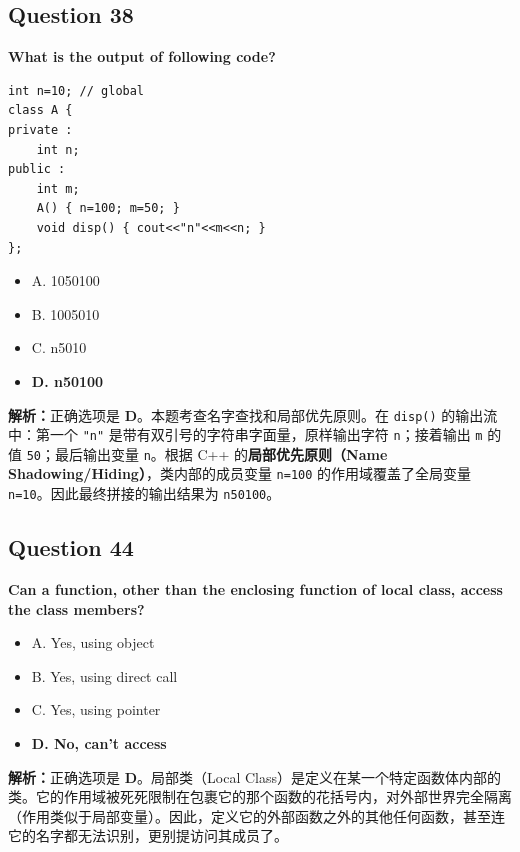 \documentclass[11pt, a4paper]{article}
\begin{document}

\subsection*{Question 38}
\textbf{What is the output of following code?}
\begin{lstlisting}
int n=10; // global
class A {
private :
    int n;
public :
    int m;
    A() { n=100; m=50; }
    void disp() { cout<<"n"<<m<<n; }
};
\end{lstlisting}
\begin{itemize}
    \item A. 1050100
    \item B. 1005010
    \item C. n5010
    \item \textbf{D. n50100}
\end{itemize}

\textbf{解析：}正确选项是 \textbf{D}。本题考查名字查找和局部优先原则。在 \texttt{disp()} 的输出流中：第一个 \texttt{"n"} 是带有双引号的字符串字面量，原样输出字符 \texttt{n}；接着输出 \texttt{m} 的值 \texttt{50}；最后输出变量 \texttt{n}。根据 C++ 的\textbf{局部优先原则（Name Shadowing/Hiding）}，类内部的成员变量 \texttt{n=100} 的作用域覆盖了全局变量 \texttt{n=10}。因此最终拼接的输出结果为 \texttt{n50100}。


\subsection*{Question 44}
\textbf{Can a function, other than the enclosing function of local class, access the class members?}
\begin{itemize}
    \item A. Yes, using object
    \item B. Yes, using direct call
    \item C. Yes, using pointer
    \item \textbf{D. No, can’t access}
\end{itemize}

\textbf{解析：}正确选项是 \textbf{D}。局部类（Local Class）是定义在某一个特定函数体内部的类。它的作用域被死死限制在包裹它的那个函数的花括号内，对外部世界完全隔离（作用类似于局部变量）。因此，定义它的外部函数之外的其他任何函数，甚至连它的名字都无法识别，更别提访问其成员了。

\end{document}
